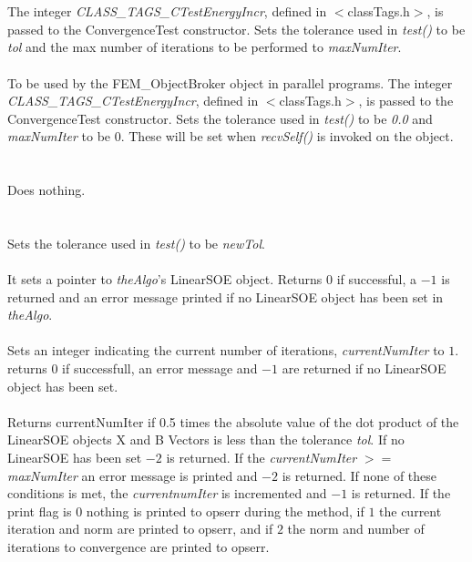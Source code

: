   \\
  \\
The integer {\em CLASS\_TAGS\_CTestEnergyIncr}, defined in
$<$classTags.h$>$, is passed to the ConvergenceTest constructor. Sets
the tolerance used in {\em test()} to be {\em tol} and the max number
of iterations to be performed to {\em maxNumIter}. \\

  \\
To be used by the FEM\_ObjectBroker object in parallel programs. The
integer {\em CLASS\_TAGS\_CTestEnergyIncr}, defined in
$<$classTags.h$>$, is passed to the ConvergenceTest constructor. Sets
the tolerance used in {\em test()} to be {\em 0.0} and {\em maxNumIter} 
to be $0$. These will be set when {\em recvSelf()} is invoked on the object. \\


 \\
 \\ 
Does nothing. \\

  \\
 \\
Sets the tolerance used in {\em test()} to be {\em newTol}. \\

 \\
It sets a pointer to {\em theAlgo}'s LinearSOE object. Returns $0$ if
successful, a $-1$ is returned and an error message printed if no
LinearSOE object has been set in {\em theAlgo}. \\


 \\
Sets an integer indicating the current number of iterations, {\em
currentNumIter} to $1$. returns $0$ if successfull, an error message
and $-1$ are returned if no LinearSOE object has been set. \\

 \\
Returns {currentNumIter} if 0.5 times the absolute value of the dot product of
the LinearSOE objects X and B Vectors is less than the tolerance {\em
tol}. If no LinearSOE has been set $-2$ is returned. If the {\em
currentNumIter} $>=$ {\em maxNumIter} an error message is printed and
$-2$ is returned. If none of these conditions is met, the {\em
currentnumIter} is incremented and $-1$ is returned. If the print flag
is $0$ nothing is printed to 
opserr during the method, if $1$ the current iteration and norm are
printed to opserr, and if $2$ the norm and number of iterations to convergence
are printed to opserr. \\ 


